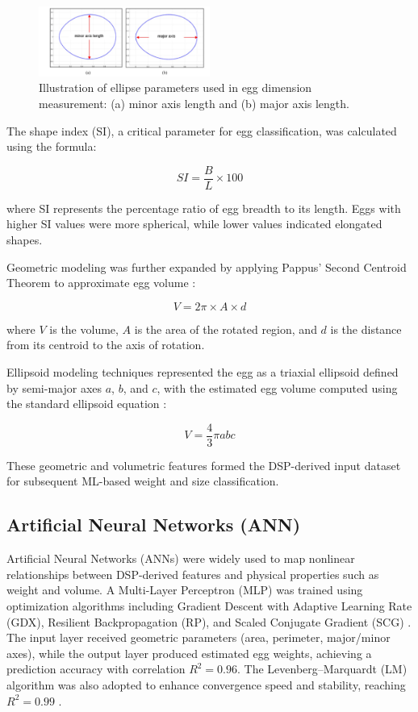 \documentclass[conference]{IEEEtran}
\begin{document}
	
	\begin{figure}[h!]
		\centering
		\includegraphics[width=0.50\textwidth]{fig2.png}
		\caption{Illustration of ellipse parameters used in egg dimension measurement: (a) minor axis length and (b) major axis length.}
		\label{fig:ellipse_axes}
	\end{figure}
	
	The shape index (SI), a critical parameter for egg classification, was calculated using the formula:
	
	\[
	SI = \frac{B}{L} \times 100
	\]
	
	
	where SI represents the percentage ratio of egg breadth to its length. Eggs with higher SI values were more spherical, while lower values indicated elongated shapes.
	
	Geometric modeling was further expanded by applying Pappus’ Second Centroid Theorem to approximate egg volume \cite{soltani2015}:
	
	\[
	V = 2 \pi \times A \times d
	\]
	
	where \(V\) is the volume, \(A\) is the area of the rotated region, and \(d\) is the distance from its centroid to the axis of rotation.
	
	Ellipsoid modeling techniques represented the egg as a triaxial ellipsoid defined by semi-major axes \(a\), \(b\), and \(c\), with the estimated egg volume computed using the standard ellipsoid equation \cite{okinda2020}:
	
	\[
	V = \frac{4}{3} \pi a b c
	\]
	
	These geometric and volumetric features formed the DSP-derived input dataset for subsequent ML-based weight and size classification.
	
	\subsection{Artificial Neural Networks (ANN)}
	
	Artificial Neural Networks (ANNs) were widely used to map nonlinear relationships between DSP-derived features and physical properties such as weight and volume. A Multi-Layer Perceptron (MLP) was trained using optimization algorithms including Gradient Descent with Adaptive Learning Rate (GDX), Resilient Backpropagation (RP), and Scaled Conjugate Gradient (SCG) \cite{asadi2010}. The input layer received geometric parameters (area, perimeter, major/minor axes), while the output layer produced estimated egg weights, achieving a prediction accuracy with correlation \(R^2 = 0.96\). The Levenberg–Marquardt (LM) algorithm was also adopted to enhance convergence speed and stability, reaching \(R^2 = 0.99\) \cite{soltani2015}.
	
\end{document}
